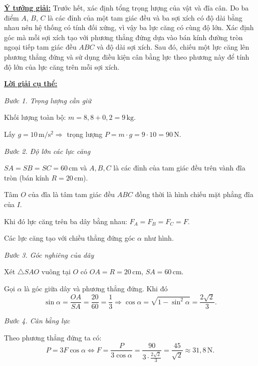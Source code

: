 \documentclass[12pt,a4paper,oneside]{book}
\theoremstyle{theorem}
\theoremstyle{definition}
\begin{document}
    \noindent \underline{\textbf{Ý tưởng giải:}}
    Trước hết, xác định tổng trọng lượng của vật và đĩa cân. Do ba điểm $A$, $B$, $C$ là các đỉnh của một tam giác đều và ba sợi xích có độ dài bằng nhau nên hệ thống có tính đối xứng, vì vậy ba lực căng có cùng độ lớn. Xác định góc mà mỗi sợi xích tạo với phương thẳng đứng dựa vào bán kính đường tròn ngoại tiếp tam giác đều $ABC$ và độ dài sợi xích. Sau đó, chiếu một lực căng lên phương thẳng đứng và sử dụng điều kiện cân bằng lực theo phương này để tính độ lớn của lực căng trên mỗi sợi xích.

    \noindent \underline{\textbf{Lời giải cụ thể:}}
    
    \noindent \textit{Bước 1. Trọng lượng cần giữ}

    Khối lượng toàn bộ: $m=8,8+0,2=9\,\mathrm{kg}$.
    
    Lấy $g=10\,\mathrm{m/s^2}\Rightarrow$ trọng lượng $P=m\cdot g=9\cdot10=90\,\mathrm{N}$.
    
    \noindent \textit{Bước 2. Độ lớn các lực căng}
    
    $SA=SB=SC=60\,\mathrm{cm}$ và $A,B,C$ là các đỉnh của tam giác đều trên vành đĩa tròn (bán kính $R=20\,\mathrm{cm}$).
    
    Tâm $O$ của đĩa là tâm tam giác đều $ABC$ đồng thời là hình chiếu mặt phẳng đĩa của $I$.
    
    Khi đó lực căng trên ba dây bằng nhau: $F_A=F_B=F_C=F$.
    
    Các lực căng tạo với chiều thẳng đứng góc $\alpha$ như hình.
    
    \noindent \textit{Bước 3. Góc nghiêng của dây}
    
    Xét $\triangle SAO$ vuông tại $O$ có $OA=R=20\,\mathrm{cm}$, $SA=60\,\mathrm{cm}$.
    
    Gọi $\alpha$ là góc giữa dây và phương thẳng đứng. Khi đó
    $$
    \sin\alpha=\frac{OA}{SA}=\frac{20}{60}=\frac{1}{3}
    \Rightarrow \cos\alpha=\sqrt{1-\sin^2\alpha}
    =\frac{2\sqrt{2}}{3}.
    $$
    
    \noindent \textit{Bước 4. Cân bằng lực}
    
    Theo phương thẳng đứng ta có:
    $$
    P=3F\cos\alpha
    \Leftrightarrow
    F=\frac{P}{3\cos\alpha}
    =\displaystyle \frac{90}{3\cdot\displaystyle\frac{2\sqrt{2}}{3}}
    =\frac{45}{\sqrt{2}}
    \approx31,8\,\mathrm{N}.
    $$
   
\end{document}
